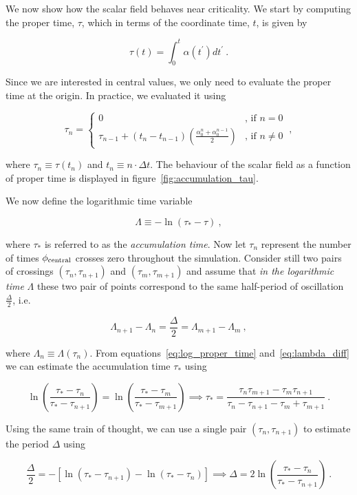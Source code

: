 \documentclass[a4paper,11pt]{article}
\renewcommand{\a}{\alpha}
\newcommand{\D}{\Delta}
\newcommand{\dt}{\Delta t}
\newcommand{\lrpar}[1]{\left( #1 \right)}
\newcommand{\lrsquare}[1]{\left[ #1 \right]}
\newcommand{\n}{\noindent}
\newcommand{\eq}[1]{
  \begin{equation}
    #1
  \end{equation}
}
\begin{document}
We now show how the scalar field behaves near criticality. We start by computing the proper time, $\tau$, which in terms of the coordinate time, $t$, is given by

\eq{
  \tau(t) = \int_{0}^{t}\a\lrpar{t^{\prime}}dt^{\prime}\ .
}

\n Since we are interested in central values, we only need to evaluate the proper time at the origin. In practice, we evaluated it using

\eq{
  \tau_{n} = \left\{
  \begin{matrix}
    0 & \text{, if } n=0\\
    \tau_{n-1} + \left(t_{n}-t_{n-1}\right)\lrpar{\frac{\alpha^{n}_{0}+\alpha^{n-1}_{0}}{2}} & \text{, if } n\neq0
  \end{matrix}
  \right.\ ,
}

\n where $\tau_{n}\equiv\tau(t_{n})$ and $t_{n}\equiv n\cdot\dt$. The behaviour of the scalar field as a function of proper time is displayed in figure~\ref{fig:accumulation_tau}.

We now define the logarithmic time variable

\eq{
  \Lambda \equiv -\ln\lrpar{\tau_{*}-\tau}\ ,\label{eq:log_proper_time}
}

\n where $\tau_{*}$ is referred to as the \emph{accumulation time}. Now let $\tau_{n}$ represent the number of times $\phi_{\rm central}$ crosses zero throughout the simulation. Consider still two pairs of crossings $\lrpar{\tau_{n},\tau_{n+1}}$ and $\lrpar{\tau_{m},\tau_{m+1}}$ and assume that \emph{in the logarithmic time} $\Lambda$ these two pair of points correspond to the same half-period of oscillation $\frac{\D}{2}$, i.e.

\eq{
  \Lambda_{n+1}-\Lambda_{n} = \frac{\D}{2} = \Lambda_{m+1}-\Lambda_{m}\ ,\label{eq:lambda_diff}
}

\n where $\Lambda_{n} \equiv \Lambda\lrpar{\tau_{n}}$. From equations~\eqref{eq:log_proper_time} and~\eqref{eq:lambda_diff} we can estimate the accumulation time $\tau_{*}$ using

\eq{
  \ln\lrpar{\frac{\tau_{*}-\tau_{n}}{\tau_{*}-\tau_{n+1}}} = \ln\lrpar{\frac{\tau_{*}-\tau_{m}}{\tau_{*}-\tau_{m+1}}} \implies \tau_{*} = \frac{\tau_{n}\tau_{m+1}-\tau_{m}\tau_{n+1}}{\tau_{n}-\tau_{n+1}-\tau_{m}+\tau_{m+1}}\ . \label{eq:tau_star}
}

Using the same train of thought, we can use a single pair $\lrpar{\tau_{n},\tau_{n+1}}$ to estimate the period $\D$ using

\eq{
  \frac{\D}{2} = -\lrsquare{\ln\lrpar{\tau_{*}-\tau_{n+1}} - \ln\lrpar{\tau_{*}-\tau_{n}}} \implies \D = 2\ln\lrpar{ \frac{\tau_{*}-\tau_{n}}{\tau_{*}-\tau_{n+1}} }\ .\label{eq:Delta_method2}
}
\end{document}
